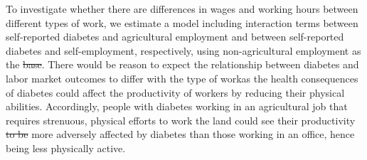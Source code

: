 \documentclass[12pt,english,british]{article}
\providecommand{\DIFaddtex}[1]{{\protect\color{blue}\uwave{#1}}} %
\providecommand{\DIFdeltex}[1]{{\protect\color{red}\sout{#1}}}                      %
\providecommand{\DIFaddbegin}{} %
\providecommand{\DIFaddend}{} %
\providecommand{\DIFdelbegin}{} %
\providecommand{\DIFdelend}{} %
\providecommand{\DIFadd}[1]{\texorpdfstring{\DIFaddtex{#1}}{#1}} %
\providecommand{\DIFdel}[1]{\texorpdfstring{\DIFdeltex{#1}}{}} %
\begin{document}
To investigate whether there are differences in
wages and working hours between different types of work, we estimate
a model including interaction terms between self-reported diabetes
and agricultural employment and between self-reported diabetes and
self-employment, respectively, using non-agricultural employment as
the \DIFdelbegin \DIFdel{base}\DIFdelend \DIFaddbegin \DIFadd{benchmark}\DIFaddend . There would be reason to expect the relationship between
diabetes and labor market outcomes to differ with the type of work\DIFaddbegin \DIFadd{, }\DIFaddend as
the health consequences of diabetes could affect the productivity
of workers by reducing their physical abilities. Accordingly, people
with diabetes working in an agricultural job that requires strenuous,
physical efforts to work the land could see their productivity \DIFdelbegin \DIFdel{to be
}\DIFdelend \DIFaddbegin \DIFadd{being
}\DIFaddend more adversely affected by diabetes than those working in an office,
hence being less physically active. 
\end{document}
